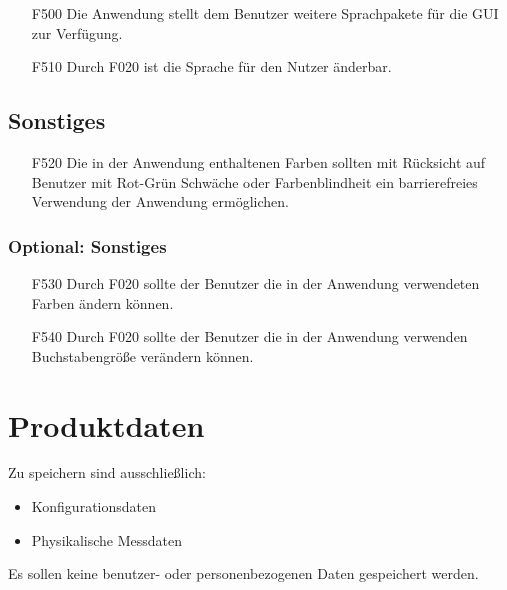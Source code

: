 \documentclass[parskip=full]{scrartcl}
\begin{document}
\begin{itemize}

\item[F500] Die Anwendung stellt dem Benutzer weitere Sprachpakete für die GUI zur Verfügung.
\item[F510] Durch F020 ist die Sprache für den Nutzer änderbar.

\end{itemize}

\subsection{Sonstiges}

\begin{itemize}

\item[F520] Die in der Anwendung enthaltenen Farben sollten mit Rücksicht auf Benutzer mit Rot-Grün Schwäche oder Farbenblindheit ein barrierefreies Verwendung der Anwendung ermöglichen.

\end{itemize}

\subsubsection{Optional: Sonstiges}

\begin{itemize}

\item[F530] Durch F020 sollte der Benutzer die in der Anwendung verwendeten Farben ändern können.
\item[F540] Durch F020 sollte der Benutzer die in der Anwendung verwenden Buchstabengröße verändern können.

\end{itemize}


\section{Produktdaten}

Zu speichern sind ausschließlich:

\begin{itemize}

\item Konfigurationsdaten
\item Physikalische Messdaten

\end{itemize}

Es sollen keine benutzer- oder personenbezogenen Daten gespeichert werden.
\end{document}

